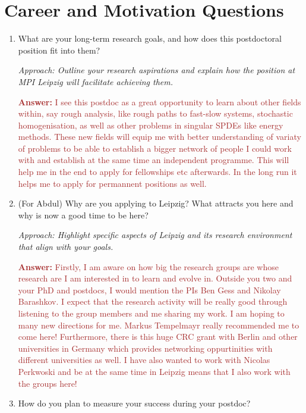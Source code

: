 \documentclass[12pt]{article}
\numberwithin{equation}{section}
\newcommand{\brown}[1]{\textcolor{brown}{#1}}
\newcommand{\blue}[1]{\textcolor{blueblue}{#1}}
\begin{document}
\section{Career and Motivation Questions}
\begin{enumerate}
    \item What are your long-term research goals, and how does this postdoctoral position fit into them?
    
    \textit{Approach: Outline your research aspirations and explain how the position at MPI Leipzig will facilitate achieving them.}

    \brown{\textbf{Answer:} I see this postdoc as a great opportunity to learn about other fields within, say rough analysis, like rough paths to fast-slow systems, stochastic homogenisation, as well as other problems in singular SPDEs like energy methods. These new fields will equip me with better understanding of variaty of problems to be able to establish a bigger network of people I could work with and establish at the same time an independent programme. This will help me in the end to apply for fellowships etc afterwards. In the long run it helps me to apply for permannent positions as well. }
    
 

      \item \blue{(For Abdul)} Why are you applying to Leipzig? What attracts you here and why is now a good time to be here?
    
    \textit{Approach: Highlight specific aspects of Leipzig and its research environment that align with your goals.}

    \brown{\textbf{Answer:} Firstly, I am aware on how big the research groups are whose research are I am interested in to learn and evolve in. Outside you two and your PhD and postdocs, I would mention the PIs Ben Gess and Nikolay Barashkov. I expect that the research activity will be really good through listening to the group members and me sharing my work. I am hoping to many new directions for me. Markus Tempelmayr really recommended me to come here! Furthermore, there is this huge CRC grant with Berlin and other universities in Germany which provides networking oppurtinities with different universities as well. I have also wanted to work with Nicolas Perkwoski and be at the same time in Leipzig means that I also work with the groups here!  }  
    

    \item How do you plan to measure your success during your postdoc?
    

\end{enumerate}
\end{document}
